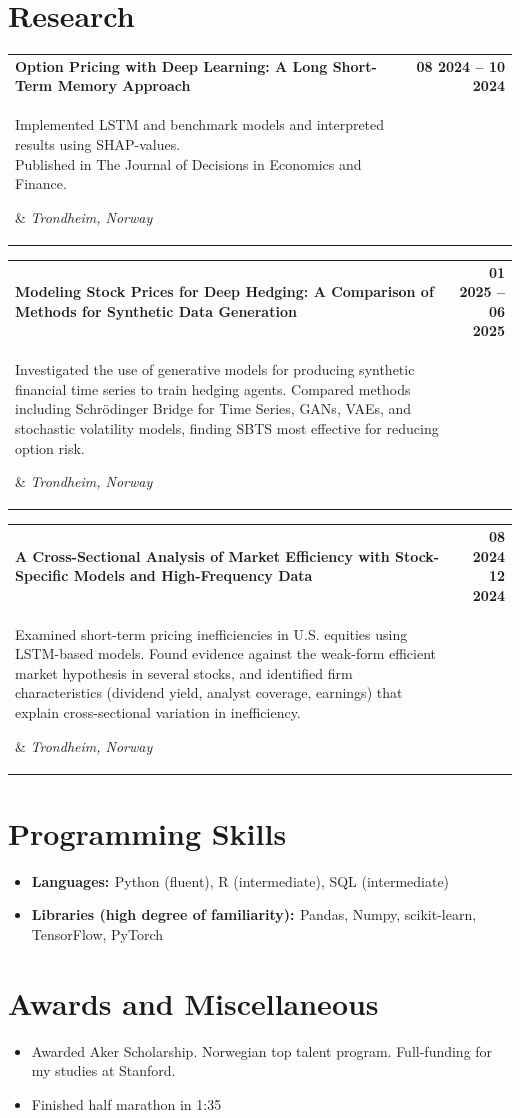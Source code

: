 \documentclass[letterpaper,11pt]{article}
\makeatletter
\newcommand{\resumeSubheadingTwo}[4]{
  \vspace{-2pt}
  \renewcommand{\arraystretch}{1}
    \begin{tabular*}{1.0\textwidth}[t]{p{0.8\textwidth}@{\extracolsep{\fill}}r}
      \textbf{\small#1} & \textbf{\small #2}\\
        \parbox[t]{0.8\textwidth}{
        \setlength{\hangindent}{1em}
        \hspace{1em}\small#3} & \textit{\small #4} \\
    \end{tabular*}\vspace{5pt}
}
\makeatother
\begin{document}
\section{Research}
    \resumeSubheadingTwo{Option Pricing with Deep Learning: A Long Short-Term Memory Approach}{08 2024 -- 10 2024}{Implemented LSTM and benchmark models and interpreted results using SHAP-values. \\Published in The Journal of Decisions in Economics and Finance.}{Trondheim, Norway}
    \resumeSubheadingTwo{Modeling Stock Prices for Deep Hedging: A Comparison of Methods for Synthetic Data Generation}{01 2025 -- 06 2025}{Investigated the use of generative models for producing synthetic financial time series to train hedging agents. Compared methods including Schrödinger Bridge for Time Series, GANs, VAEs, and stochastic volatility models, finding SBTS most effective for reducing option risk.}{Trondheim, Norway}
    \resumeSubheadingTwo{A Cross-Sectional Analysis of Market Efficiency with Stock-Specific Models and High-Frequency Data}{08 2024 12 2024}{Examined short-term pricing inefficiencies in U.S. equities using LSTM-based models. Found evidence against the weak-form efficient market hypothesis in several stocks, and identified firm characteristics (dividend yield, analyst coverage, earnings) that explain cross-sectional variation in inefficiency.}{Trondheim, Norway}
    \vspace{-10pt}

\section{Programming Skills}
    \begin{itemize}
        \item\textbf{\small{Languages: }}\small{Python (fluent), R (intermediate), SQL (intermediate)}
        \vspace{-3pt}\item\textbf{\small{Libraries (high degree of familiarity): }}\small{Pandas, Numpy, scikit-learn, TensorFlow, PyTorch}
    \end{itemize}
    \vspace{-10pt}

    
\section{Awards and Miscellaneous}
    \begin{itemize}
        \item \small{Awarded Aker Scholarship. Norwegian top talent program. Full-funding for my studies at Stanford.}
        \vspace{-3pt}
        \vspace{-3pt}
        \item \small{Finished half marathon in 1:35}
    \end{itemize}
\end{document}
